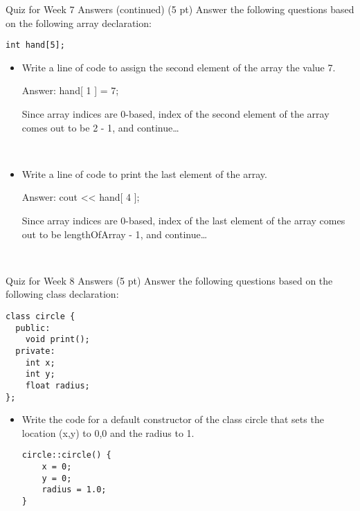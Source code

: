 \documentclass[presentation]{beamer}
\begin{document}
\begin{frame}[fragile,label=sec-2]{Quiz for Week 7 \alert{Answers} (continued)}
 (5 pt) Answer the following questions based on the following array declaration:
\begin{verbatim}
int hand[5];
\end{verbatim}
\begin{itemize}
\item Write a line of code to assign the second element of the array the value 7.

Answer: \alert{hand[ 1 ] = 7;}

Since array indices are \alert{0-based}, index of the \alert{second} element of the array comes out to be \alert{2 - 1}, and continue\ldots{}
\end{itemize}
\\
\begin{itemize}
\item Write a line of code to print the last element of the array.

Answer: \alert{cout << hand[ 4 ];}

Since array indices are \alert{0-based}, index of the \alert{last} element of the array comes out to be \alert{lengthOfArray - 1}, and continue\ldots{}
\end{itemize}
\\
\end{frame}

\begin{frame}[fragile,label=sec-3]{Quiz for Week 8 \alert{Answers}}
 (5 pt) Answer the following questions based on the following class declaration:
\begin{verbatim}
class circle {
  public:
    void print();
  private:
    int x;
    int y;
    float radius;
};
\end{verbatim}

\begin{itemize}
\item Write the code for a default constructor of the class circle that sets the location (x,y) to 0,0 and the radius to 1.
\begin{verbatim}
circle::circle() {
    x = 0;
    y = 0;
    radius = 1.0;
}
\end{verbatim}
\end{itemize}
\end{frame}
\end{document}
